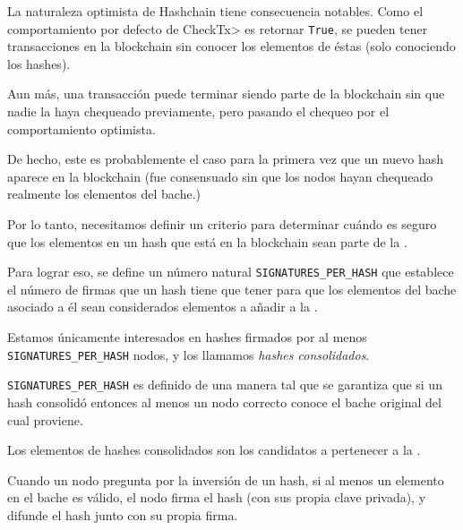 %
La naturaleza optimista de Hashchain tiene consecuencia notables.
%
Como el comportamiento por defecto de  \<CheckTx> es retornar \texttt{True},
se pueden tener transacciones en la blockchain sin conocer los elementos de éstas
(solo conociendo los hashes).

%
Aun más, una transacción puede terminar siendo parte de la blockchain sin que nadie
la haya chequeado previamente, pero pasando el chequeo por el comportamiento optimista.

%
De hecho, este es probablemente el caso para la primera vez que un nuevo hash aparece
en la blockchain (fue consensuado sin que los nodos hayan chequeado realmente los elementos
del bache.)

%

Por lo tanto, necesitamos definir un criterio para determinar cuándo es seguro
que los elementos en un hash que está en la blockchain sean parte de la \setchain.

%
Para lograr eso, se define un número natural \texttt{SIGNATURES\_PER\_HASH} que establece
el número de firmas que un hash tiene que tener para que los elementos del bache asociado a él
sean considerados elementos a añadir a la \setchain.

%
Estamos únicamente interesados en hashes firmados por al menos \texttt{SIGNATURES\_PER\_HASH}
nodos, y los llamamos \textit{hashes consolidados}.

\texttt{SIGNATURES\_PER\_HASH} es definido de una manera tal que se garantiza que si un hash
consolidó entonces al menos un nodo correcto conoce el bache original del cual proviene.

%
Los elementos de hashes consolidados son los candidatos a pertenecer a la \setchain.

%
Cuando un nodo pregunta por la inversión de un hash, si al menos un elemento en el bache
es válido, el nodo firma el hash (con sus propia clave privada), y difunde el hash junto
con su propia firma.


